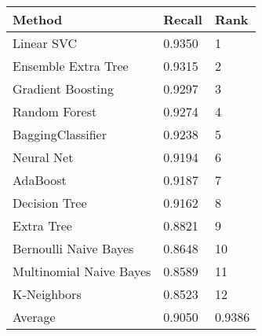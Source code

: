 \begin{tabular}{|l|l|l| }
\hline
Method                  & Recall & Rank \\ \hline
Linear SVC              & 0.9350 & 1\\
Ensemble Extra Tree     & 0.9315 & 2\\
Gradient Boosting       & 0.9297 & 3\\
Random Forest           & 0.9274 & 4\\
BaggingClassifier       & 0.9238 & 5\\
Neural Net              & 0.9194 & 6\\
AdaBoost                & 0.9187 & 7\\
Decision Tree           & 0.9162 & 8\\
Extra Tree              & 0.8821 & 9\\
Bernoulli Naive Bayes   & 0.8648 & 10\\
Multinomial Naive Bayes & 0.8589 & 11\\
K-Neighbors             & 0.8523 & 12\\
Average & 0.9050 & 0.9386 & \\
\hline
\end{tabular}